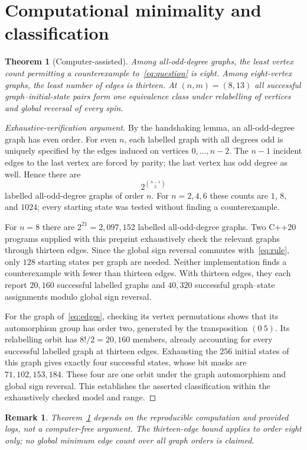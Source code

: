 \documentclass[11pt,a4paper]{article}
\newtheorem{theorem}{Theorem}
\newtheorem{remark}{Remark}
\begin{document}
\section{Computational minimality and classification}
\begin{theorem}[Computer-assisted]\label{thm:classification}
Among all-odd-degree graphs, the least vertex count permitting a counterexample to~\eqref{eq:question} is eight. Among eight-vertex graphs, the least number of edges is thirteen. At $(n,m)=(8,13)$ all successful graph--initial-state pairs form one equivalence class under relabelling of vertices and global reversal of every spin.
\end{theorem}
\begin{proof}[Exhaustive-verification argument]
By the handshaking lemma, an all-odd-degree graph has even order. For even $n$, each labelled graph with all degrees odd is uniquely specified by the edges induced on vertices $0,\dots,n-2$. The $n-1$ incident edges to the last vertex are forced by parity; the last vertex has odd degree as well. Hence there are
\begin{equation}
2^{\binom{n-1}{2}}
\end{equation}
labelled all-odd-degree graphs of order $n$. For $n=2,4,6$ these counts are $1$, $8$, and $1024$; every starting state was tested without finding a counterexample.

For $n=8$ there are $2^{21}=2{,}097{,}152$ labelled all-odd-degree graphs. Two C++20 programs supplied with this preprint exhaustively check the relevant graphs through thirteen edges. Since the global sign reversal commutes with~\eqref{eq:rule}, only $128$ starting states per graph are needed. Neither implementation finds a counterexample with fewer than thirteen edges. With thirteen edges, they each report $20{,}160$ successful labelled graphs and $40{,}320$ successful graph--state assignments modulo global sign reversal.

For the graph of~\eqref{eq:edges}, checking its vertex permutations shows that its automorphism group has order two, generated by the transposition $(0\ 5)$. Its relabelling orbit has $8!/2=20{,}160$ members, already accounting for every successful labelled graph at thirteen edges. Exhausting the $256$ initial states of this graph gives exactly four successful states, whose bit masks are $71,102,153,184$. These four are one orbit under the graph automorphism and global sign reversal. This establishes the asserted classification within the exhaustively checked model and range.
\end{proof}
\begin{remark}
Theorem~\ref{thm:classification} depends on the reproducible computation and provided logs, not a computer-free argument. The thirteen-edge bound applies to order eight only; no global minimum edge count over all graph orders is claimed.
\end{remark}
\end{document}
